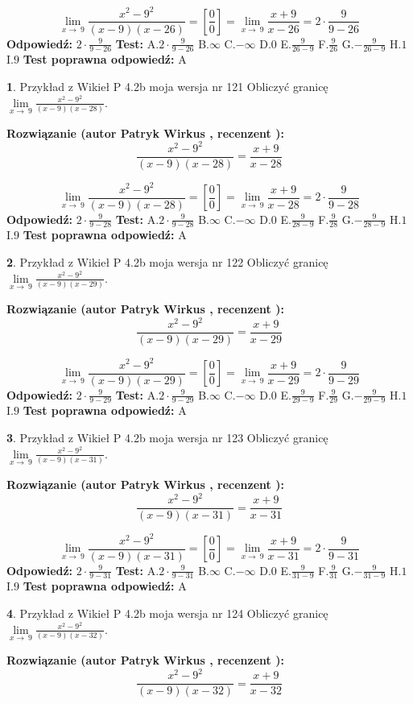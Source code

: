 \documentclass[12pt, a4paper]{article}
\theoremstyle{definition} %
\newtheorem{zad}{}
\newcommand{\zadStart}[1]{\begin{zad}#1\newline}
\newcommand{\zadStop}{\end{zad}}
\newcommand{\rozwStart}[2]{\noindent \textbf{Rozwiązanie (autor #1 , recenzent #2): }\newline}
\newcommand{\rozwStop}{\newline}
\newcommand{\odpStart}{\noindent \textbf{Odpowiedź:}\newline}
\newcommand{\odpStop}{\newline}
\newcommand{\testStart}{\noindent \textbf{Test:}\newline}
\newcommand{\testStop}{\newline}
\newcommand{\kluczStart}{\noindent \textbf{Test poprawna odpowiedź:}\newline}
\newcommand{\kluczStop}{\newline}
\begin{document}
$$\lim\limits_{x\to\ 9}\frac{x^{2}-9^{2}}{(x-9)(x-26)}=[\frac{0}{0}]=\lim\limits_{x\to\ 9}\frac{x+9}{x-26}=2 \cdot \frac{9}{9-26}$$
\rozwStop
\odpStart
$2 \cdot \frac{9}{9-26}$
\odpStop
\testStart
A.$2 \cdot \frac{9}{9-26}$
B.$\infty$
C.$-\infty$
D.$0$
E.$\frac{9}{26-9}$
F.$\frac{9}{26}$
G.$-\frac{9}{26-9}$
H.$1$
I.$9$
\testStop
\kluczStart
A
\kluczStop



\zadStart{Przykład z Wikieł P 4.2b moja wersja nr 121}
Obliczyć granicę $\lim\limits_{x\to\ 9}\frac{x^{2}-9^{2}}{(x-9)(x-28)}$.
\zadStop
\rozwStart{Patryk Wirkus}{}
$$\frac{x^{2}-9^{2}}{(x-9)(x-28)}=\frac{x+9}{x-28}$$

$$\lim\limits_{x\to\ 9}\frac{x^{2}-9^{2}}{(x-9)(x-28)}=[\frac{0}{0}]=\lim\limits_{x\to\ 9}\frac{x+9}{x-28}=2 \cdot \frac{9}{9-28}$$
\rozwStop
\odpStart
$2 \cdot \frac{9}{9-28}$
\odpStop
\testStart
A.$2 \cdot \frac{9}{9-28}$
B.$\infty$
C.$-\infty$
D.$0$
E.$\frac{9}{28-9}$
F.$\frac{9}{28}$
G.$-\frac{9}{28-9}$
H.$1$
I.$9$
\testStop
\kluczStart
A
\kluczStop



\zadStart{Przykład z Wikieł P 4.2b moja wersja nr 122}
Obliczyć granicę $\lim\limits_{x\to\ 9}\frac{x^{2}-9^{2}}{(x-9)(x-29)}$.
\zadStop
\rozwStart{Patryk Wirkus}{}
$$\frac{x^{2}-9^{2}}{(x-9)(x-29)}=\frac{x+9}{x-29}$$

$$\lim\limits_{x\to\ 9}\frac{x^{2}-9^{2}}{(x-9)(x-29)}=[\frac{0}{0}]=\lim\limits_{x\to\ 9}\frac{x+9}{x-29}=2 \cdot \frac{9}{9-29}$$
\rozwStop
\odpStart
$2 \cdot \frac{9}{9-29}$
\odpStop
\testStart
A.$2 \cdot \frac{9}{9-29}$
B.$\infty$
C.$-\infty$
D.$0$
E.$\frac{9}{29-9}$
F.$\frac{9}{29}$
G.$-\frac{9}{29-9}$
H.$1$
I.$9$
\testStop
\kluczStart
A
\kluczStop



\zadStart{Przykład z Wikieł P 4.2b moja wersja nr 123}
Obliczyć granicę $\lim\limits_{x\to\ 9}\frac{x^{2}-9^{2}}{(x-9)(x-31)}$.
\zadStop
\rozwStart{Patryk Wirkus}{}
$$\frac{x^{2}-9^{2}}{(x-9)(x-31)}=\frac{x+9}{x-31}$$

$$\lim\limits_{x\to\ 9}\frac{x^{2}-9^{2}}{(x-9)(x-31)}=[\frac{0}{0}]=\lim\limits_{x\to\ 9}\frac{x+9}{x-31}=2 \cdot \frac{9}{9-31}$$
\rozwStop
\odpStart
$2 \cdot \frac{9}{9-31}$
\odpStop
\testStart
A.$2 \cdot \frac{9}{9-31}$
B.$\infty$
C.$-\infty$
D.$0$
E.$\frac{9}{31-9}$
F.$\frac{9}{31}$
G.$-\frac{9}{31-9}$
H.$1$
I.$9$
\testStop
\kluczStart
A
\kluczStop



\zadStart{Przykład z Wikieł P 4.2b moja wersja nr 124}
Obliczyć granicę $\lim\limits_{x\to\ 9}\frac{x^{2}-9^{2}}{(x-9)(x-32)}$.
\zadStop
\rozwStart{Patryk Wirkus}{}
$$\frac{x^{2}-9^{2}}{(x-9)(x-32)}=\frac{x+9}{x-32}$$
\end{document}
